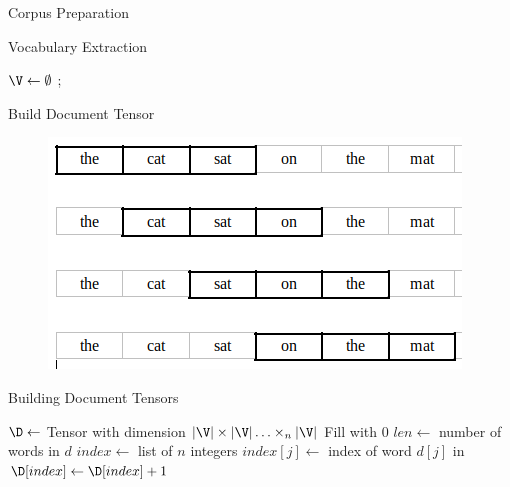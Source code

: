 \documentclass[handout]{beamer}
\begin{document}
\begin{frame}{Corpus Preparation}
\begin{algorithm}[H]
  \caption{Prepare}
  \label{alg:Prepare}
  \BlankLine
\end{algorithm}
\end{frame}


\begin{frame}{Vocabulary Extraction}
\begin{algorithm}[H]
  \caption{Build Vocabulary}
  \label{alg:vocabulary}
  \Output{\V}
  \BlankLine
  $\V\leftarrow\emptyset$\;
  \Return{\V};
\end{algorithm}
\end{frame}


\begin{frame}{Build Document Tensor}
  \begin{figure}
    \centering
    \includegraphics[height=0.5\textheight]{diagrams/sliding-window}
  \end{figure}
\end{frame}

\begin{frame}{Building Document Tensors}
  \small
\begin{algorithm}[H]
  \caption{Build Tensor}
  \label{alg:BuildTensor}
    
  
  \Output{\D}
  \BlankLine
  $\D \leftarrow $ Tensor with dimension $|\V| \times |\V| \ldots
  \times_n |\V|$\;
  Fill \D with 0\;
  $len \leftarrow$ number of words in $d$\;
   {
    $index \leftarrow$ list of $n$ integers\;
     {
      $index[j] \leftarrow$ index of word $d[j]$ in \V\;
    }
    $\D[index] \leftarrow \D[index] + 1$\;
  }
  \Return{\D}
\end{algorithm}
\end{frame}
\end{document}
